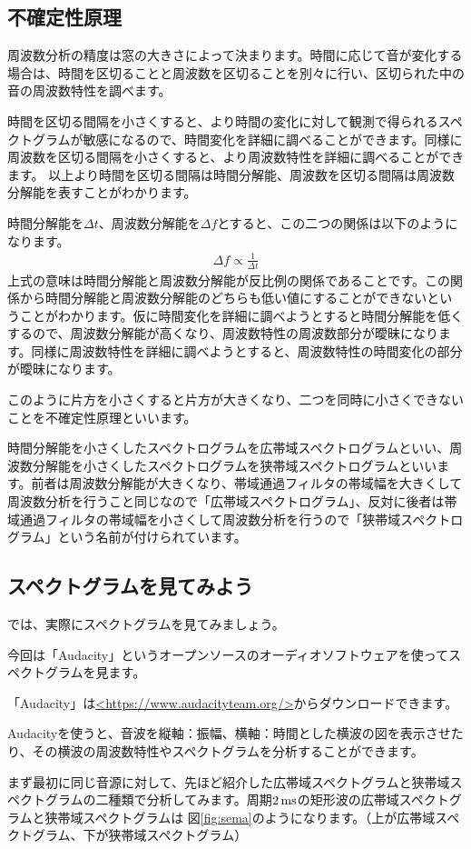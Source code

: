 \documentclass[11pt,b5paper,papersize,dvipdfmx]{jsbook}
\begin{document}
%
\subsection{不確定性原理}
周波数分析の精度は窓の大きさによって決まります。時間に応じて音が変化する場合は、時間を区切ることと周波数を区切ることを別々に行い、区切られた中の音の周波数特性を調べます。\par
時間を区切る間隔を小さくすると、より時間の変化に対して観測で得られるスペクトグラムが敏感になるので、時間変化を詳細に調べることができます。同様に周波数を区切る間隔を小さくすると、より周波数特性を詳細に調べることができます。
以上より時間を区切る間隔は時間分解能、周波数を区切る間隔は周波数分解能を表すことがわかります。\par
\newpage
時間分解能を$\Delta t$、周波数分解能を$\Delta f$とすると、この二つの関係は以下のようになります。
\begin{align}
  \Delta f \propto \frac{1}{\Delta t}
\end{align}
上式の意味は時間分解能と周波数分解能が反比例の関係であることです。この関係から時間分解能と周波数分解能のどちらも低い値にすることができないということがわかります。仮に時間変化を詳細に調べようとすると時間分解能を低くするので、周波数分解能が高くなり、周波数特性の周波数部分が曖昧になります。同様に周波数特性を詳細に調べようとすると、周波数特性の時間変化の部分が曖昧になります。\par
このように片方を小さくすると片方が大きくなり、二つを同時に小さくできないことを不確定性原理といいます。\par
時間分解能を小さくしたスペクトログラムを広帯域スペクトログラムといい、周波数分解能を小さくしたスペクトログラムを狭帯域スペクトログラムといいます。前者は周波数分解能が大きくなり、帯域通過フィルタの帯域幅を大きくして周波数分析を行うこと同じなので「広帯域スペクトログラム」、反対に後者は帯域通過フィルタの帯域幅を小さくして周波数分析を行うので「狭帯域スペクトログラム」という名前が付けられています。

%
\subsection{スペクトグラムを見てみよう}
では、実際にスペクトグラムを見てみましょう。\par
今回は「Audacity」というオープンソースのオーディオソフトウェアを使ってスペクトグラムを見ます。\par
「Audacity」は\url{<https://www.audacityteam.org/>}からダウンロードできます。\par
Audacityを使うと、音波を縦軸：振幅、横軸：時間とした横波の図を表示させたり、その横波の周波数特性やスペクトグラムを分析することができます。\par
まず最初に同じ音源に対して、先ほど紹介した広帯域スペクトグラムと狭帯域スペクトグラムの二種類で分析してみます。周期$2\tani{ms}$の矩形波の広帯域スペクトグラムと狭帯域スペクトグラムは
図\ref{fig:sema}のようになります。（上が広帯域スペクトグラム、下が狭帯域スペクトグラム）
\end{document}
